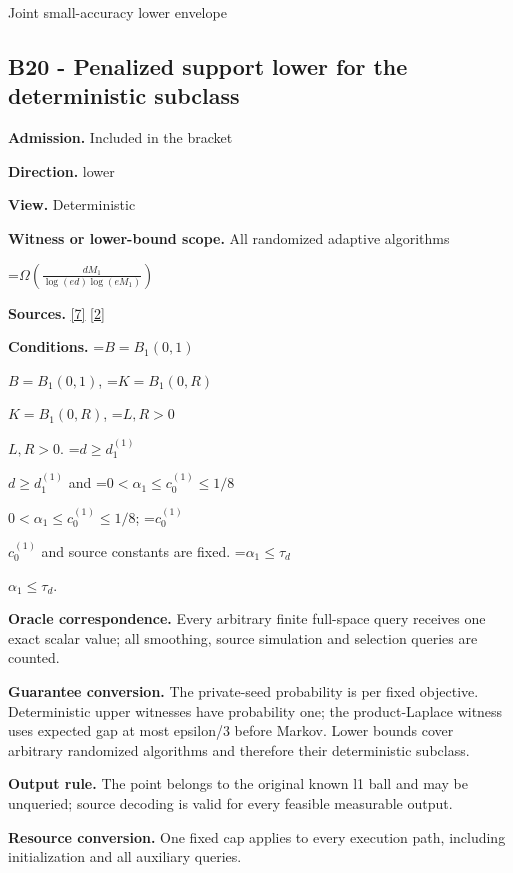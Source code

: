 \documentclass[10pt,a4paper]{article}
\newcommand{\AtlasMath}[1]{\par\begingroup\centering\setbox0=\hbox{$\displaystyle #1$}\ifdim\wd0>1.4\linewidth\typeout{ATLAS WIDE FORMULA: \the\wd0}\fi\ifdim\wd0>\linewidth\resizebox{\linewidth}{!}{\box0}\else\box0\fi\par\endgroup}
\newcommand{\AtlasInlineMath}[1]{\begingroup\setbox0=\hbox{$#1$}\ifdim\wd0>.4\linewidth\endgroup\AtlasMath{#1}\else\endgroup$#1$\fi}
\begin{document}
Joint small-accuracy lower envelope



\subsection{B20 - Penalized support lower for the deterministic subclass}


\textbf{Admission.} Included in the bracket



\textbf{Direction.} lower



\textbf{View.} Deterministic



\textbf{Witness or lower-bound scope.} All randomized adaptive algorithms



\AtlasMath{\Omega\!\left(\frac{dM_1}{\log(ed)\log(eM_1)}\right)}


\textbf{Sources.} \href{https://github.com/WU-Wendao/Colombo/blob/main/colombo_sensorium/Complexity_altas/data/sources/colombo/COLOMBO_KIMI_001/kimi_001.pdf}{[7]} \href{https://arxiv.org/html/2607.16558v2}{[2]}



\textbf{Conditions.} \AtlasInlineMath{B=B_1(0,1)}, \AtlasInlineMath{K=B_1(0,R)}, \AtlasInlineMath{L,R>0}. \AtlasInlineMath{d\ge d_1^{(1)}} and \AtlasInlineMath{0<\alpha_1\le c_0^{(1)}\le1/8}; \AtlasInlineMath{c_0^{(1)}} and source constants are fixed. \AtlasInlineMath{\alpha_1\le\tau_d}.



\textbf{Oracle correspondence.} Every arbitrary finite full-space query receives one exact scalar value; all smoothing, source simulation and selection queries are counted.



\textbf{Guarantee conversion.} The private-seed probability is per fixed objective. Deterministic upper witnesses have probability one; the product-Laplace witness uses expected gap at most epsilon/3 before Markov. Lower bounds cover arbitrary randomized algorithms and therefore their deterministic subclass.



\textbf{Output rule.} The point belongs to the original known l1 ball and may be unqueried; source decoding is valid for every feasible measurable output.



\textbf{Resource conversion.} One fixed cap applies to every execution path, including initialization and all auxiliary queries.
\end{document}
